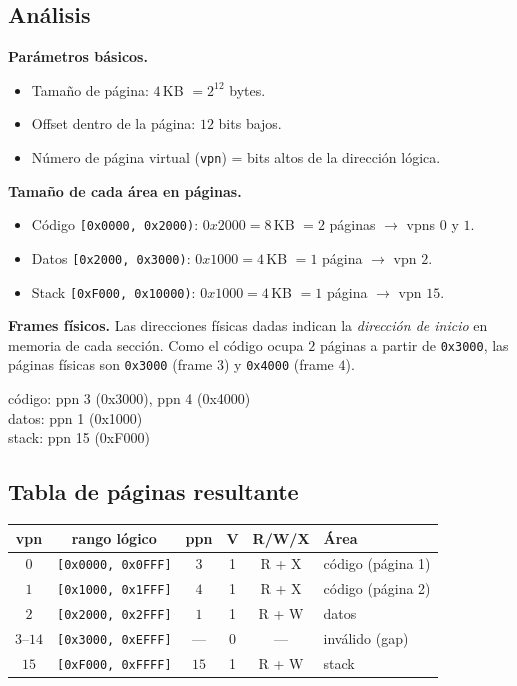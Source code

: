 \documentclass[11pt,a4paper]{article}
\begin{document}
\subsection*{Análisis}

\textbf{Parámetros básicos.}

\begin{itemize}[leftmargin=*,nosep]
    \item Tamaño de página: $4$\,KB $= 2^{12}$ bytes.
    \item Offset dentro de la página: $12$ bits bajos.
    \item Número de página virtual (\texttt{vpn}) = bits altos de la
        dirección lógica.
\end{itemize}

\textbf{Tamaño de cada área en páginas.}

\begin{itemize}[leftmargin=*,nosep]
    \item Código \texttt{[0x0000, 0x2000)}: $0x2000 = 8$\,KB
        $= 2$ páginas $\to$ vpns $0$ y $1$.
    \item Datos \texttt{[0x2000, 0x3000)}: $0x1000 = 4$\,KB
        $= 1$ página $\to$ vpn $2$.
    \item Stack \texttt{[0xF000, 0x10000)}: $0x1000 = 4$\,KB
        $= 1$ página $\to$ vpn $15$.
\end{itemize}

\textbf{Frames físicos.} Las direcciones físicas dadas indican la
\emph{dirección de inicio} en memoria de cada sección. Como el código
ocupa $2$ páginas a partir de \texttt{0x3000}, las páginas físicas son
\texttt{0x3000} (frame $3$) y \texttt{0x4000} (frame $4$).

\quad código: ppn 3 (0x3000), ppn 4 (0x4000) \\
\quad datos: ppn 1 (0x1000) \\
\quad stack: ppn 15 (0xF000)

\subsection*{Tabla de páginas resultante}

\begin{center}
\small
\begin{tabular}{@{}cccccp{4cm}@{}}
\toprule
vpn  & rango lógico                & ppn          & V & R/W/X        & Área \\
\midrule
$0$  & \texttt{[0x0000, 0x0FFF]}   & $3$          & 1 & R + X        & código (página 1) \\
$1$  & \texttt{[0x1000, 0x1FFF]}   & $4$          & 1 & R + X        & código (página 2) \\
$2$  & \texttt{[0x2000, 0x2FFF]}   & $1$          & 1 & R + W        & datos \\
$3$--$14$ & \texttt{[0x3000, 0xEFFF]} & ---       & 0 & ---          & inválido (gap) \\
$15$ & \texttt{[0xF000, 0xFFFF]}   & $15$         & 1 & R + W        & stack \\
\bottomrule
\end{tabular}
\end{center}
\end{document}
